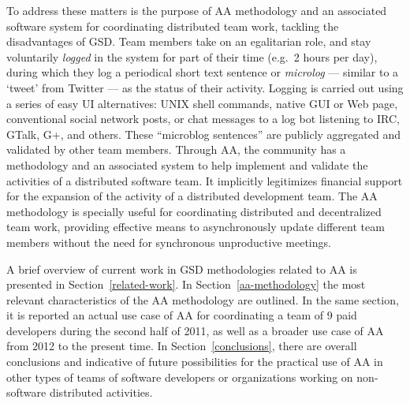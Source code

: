 \documentclass{article}
\newcommand{\indraftnote}[1]{}
\newcommand{\todo}[1]{\indraftnote{todo: #1}}
\begin{document}
To address these matters is the purpose of
AA methodology and an associated software system
for coordinating distributed team work, tackling the disadvantages
of GSD. Team members take on an egalitarian role, and stay
voluntarily \textit{logged} in the system for part of their time
(e.g.\ 2 hours per day), during which they log a periodical short text
sentence or \emph{microlog} --- similar to a `tweet' from Twitter --- as the
status of their activity. Logging is carried out using a series of
easy UI alternatives: UNIX shell
commands, native GUI or Web page, conventional social network posts, or chat messages to a log bot
listening to IRC, GTalk, G+, and others.  These ``microblog sentences'' are
publicly aggregated and validated by other team members. Through AA, the
community has a
methodology and an associated system to help
implement and validate the activities of a distributed software team. It implicitly
legitimizes financial support for the expansion of the activity of a
distributed development team. The AA methodology is specially useful for
coordinating distributed and decentralized team work, providing effective means
to asynchronously update different team members without the need for synchronous
unproductive meetings.


A brief overview of current work in GSD methodologies related to AA is presented
in Section~\ref{related-work}. In Section~\ref{aa-methodology} the most relevant
characteristics of the AA methodology are outlined. In the same section, it
is reported an actual use case of AA for coordinating a team of 9 paid developers 
during the second half of 2011, as well as a broader use case of AA from 2012 to
the present time.  In Section~\ref{conclusions}, there are overall conclusions
and indicative of future possibilities for the practical use of AA in other types of
teams of software developers or organizations working on non-software distributed
activities.

\indraftnote{
A very good article on the value of asynchronous communication for personal
and group productivity, related to the key necessity of having moments of
introversion to avoid daily pressures of forced socialization. The way we work
on the digital age enables people to be very productive, the article also
mentions Linux as a hallmark example~\cite{Thompson:Wired:2012}
}
\end{document}
